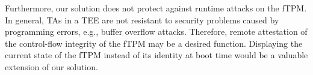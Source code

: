 Furthermore, our solution does not protect against runtime attacks on the fTPM\@.
In general, \acp{TA} in a \ac{TEE} are not resistant to security problems caused by programming errors, e.g., buffer overflow attacks.
Therefore, remote attestation of the control-flow integrity of the fTPM may be a desired function.
Displaying the current state of the fTPM instead of its identity at boot time would be a valuable extension of our solution.

